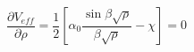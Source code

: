 \begin{equation}
\frac{\partial V_{eff}}{\partial \rho} = \frac{1}{2} [\alpha_0 \frac {\sin \beta
\sqrt{\rho}} {\beta \sqrt{\rho}} -
\chi]= 0
\end{equation}

